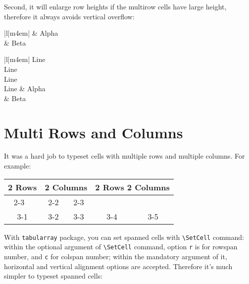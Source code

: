 \documentclass[oneside]{book}
\begin{document}
Second, it will enlarge row heights if the multirow cells have large height,
therefore it always avoids vertical overflow:

\begin{demo}
\begin{tabular}{|l|m{4em}|}
\hline
  & Alpha \\
 & Beta \\
\hline
\end{tabular}
\end{demo}

\begin{demohigh}
\begin{tblr}{|l|m{4em}|}
\hline
  {Line \\ Line \\ Line \\ Line} & Alpha \\
 & Beta \\
\hline
\end{tblr}
\end{demohigh}

\section{Multi Rows and Columns}

It was a hard job to typeset cells with multiple rows and multiple columns. For example:

\begin{demo}
\begin{tabular}{|c|c|c|c|c|}
\hline
 \multirow{2}{*}{2 Rows}
     & \multicolumn{2}{c|}{2 Columns}
                 & \multicolumn{2}{c|}{\multirow{2}{*}{2 Rows 2 Columns}} \\
\cline{2-3}
     & 2-2 & 2-3 & \multicolumn{2}{c|}{} \\
\hline
 3-1 & 3-2 & 3-3 & 3-4 & 3-5 \\
\hline
\end{tabular}
\end{demo}

With \verb!tabularray! package, you can set spanned cells with \verb!\SetCell! command:
within the optional argument of \verb!\SetCell! command,
option \verb!r! is for rowspan number, and \verb!c! for colspan number;
within the mandatory argument of it, horizontal and vertical alignment options are accepted.
Therefore it's much simpler to typeset spanned cells:
\end{document}
